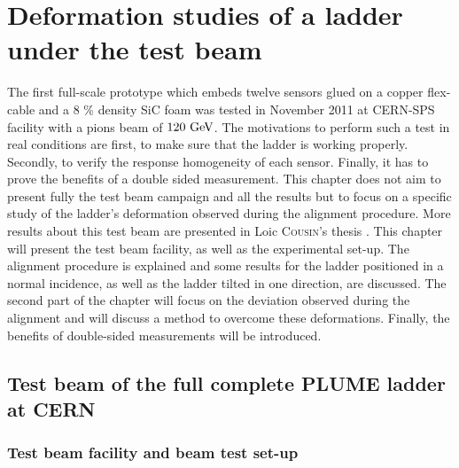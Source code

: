 \chapter{Deformation studies of a ladder under the test beam}
\label{chap:deformation}

  The first full-scale prototype which embeds twelve sensors glued on a copper flex-cable and a 8 \% density \gls{SiC} foam was tested in November 2011 at CERN-SPS facility with a pions beam of $120~\rm{GeV}$.
  The motivations to perform such a test in real conditions are first, to make sure that the ladder is working properly.
  Secondly, to verify the response homogeneity of each sensor.
  Finally, it has to prove the benefits of a double sided measurement.
  This chapter does not aim to present fully the test beam campaign and all the results but to focus on a specific study of the ladder's deformation observed during the alignment procedure.
  More results about this test beam are presented in Loic \textsc{Cousin}'s thesis \cite{cousin}.
  This chapter will present the test beam facility, as well as the experimental set-up.
  The alignment procedure is explained and some results for the ladder positioned in a normal incidence, as well as the ladder tilted in one direction, are discussed.
  The second part of the chapter will focus on the deviation observed during the alignment and will discuss a method to overcome these deformations.
  Finally, the benefits of double-sided measurements will be introduced.
  
  \minitoc

  \section{Test beam of the full complete PLUME ladder at CERN}

    \subsection{Test beam facility and beam test set-up}

